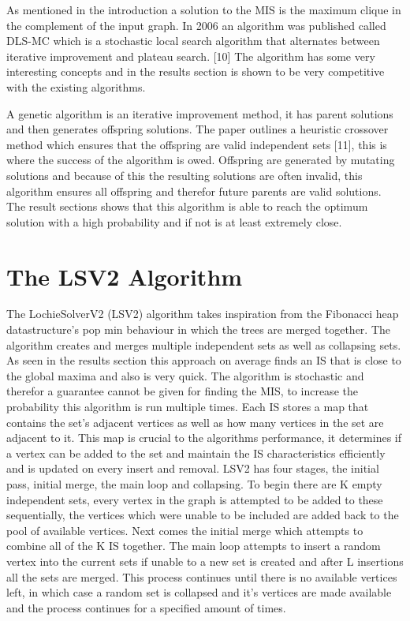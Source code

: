 \documentclass[conference]{IEEEtran}
\begin{document}
As mentioned in the introduction a solution to the MIS is the maximum clique in the complement of the input graph. In
2006 an algorithm was published called DLS-MC which is a stochastic local search algorithm that alternates between
iterative improvement and plateau search. [10] The algorithm has some very interesting concepts and in the results 
section is shown to be very competitive with the existing algorithms.

A genetic algorithm is an iterative improvement method, it has parent solutions and then generates offspring solutions.
The paper outlines a heuristic crossover method which ensures that the offspring are valid independent sets [11], this
is where the success of the algorithm is owed. Offspring are generated by mutating solutions and because of this the
resulting solutions are often invalid, this algorithm ensures all offspring and therefor future parents are valid 
solutions. The result sections shows that this algorithm is able to reach the optimum solution with a high probability
and if not is at least extremely close.


\section{The LSV2 Algorithm}

The LochieSolverV2 (LSV2) algorithm takes inspiration from the Fibonacci heap datastructure's pop min behaviour in which 
the trees are merged together. The algorithm creates and merges multiple independent sets as well as collapsing sets. As 
seen in the results section this approach on average finds an IS that is close to the global maxima and also is very quick. 
The algorithm is stochastic and therefor a guarantee cannot be given for finding the MIS, to increase the probability this algorithm is run 
multiple times. Each IS stores a map that contains the set's adjacent vertices as well as how many vertices in the set are adjacent to it.
This map is crucial to the algorithms performance, it determines if a vertex can be added to the set and maintain the IS characteristics efficiently and is updated
on every insert and removal. LSV2 has four stages, the initial pass, initial merge, the main loop and collapsing.
To begin there are K empty independent sets, every vertex in the graph is attempted to be added to these sequentially, 
the vertices which were unable to be included are added back to the pool of available vertices. Next comes the initial merge
which attempts to combine all of the K IS together. The main loop attempts to insert a random vertex into the current sets
if unable to a new set is created and after L insertions all the sets are merged. This process continues until there is no
available vertices left, in which case a random set is collapsed and it's vertices are made available and the process continues
for a specified amount of times.
\end{document}
